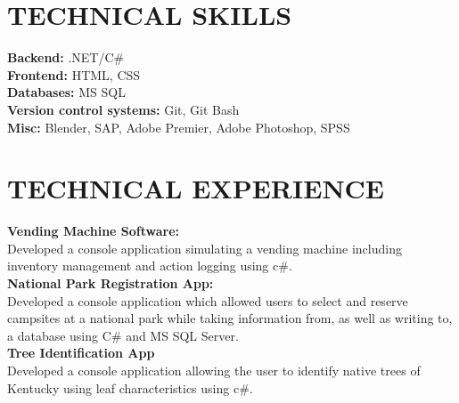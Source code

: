\documentclass[margin,line]{resume}
\begin{document}
\begin{resume}
    \vspace{-1mm}

\sectionline

    \section{\mysidestyle \textbf{\large{T}\small{ECHNICAL}  \large{S}\small{KILLS}}}

    \textbf{Backend:} .NET/C\#\vspace{1mm}\\
    \textbf{Frontend:} HTML, CSS\vspace{1mm}\\
    \textbf{Databases:} MS SQ\vspace{1mm}L\\
    \textbf{Version control systems:} Git, Git Bash\vspace{1mm}\\
    \textbf{Misc:} Blender, SAP, Adobe Premier, Adobe Photoshop, SPSS

\sectionline

    \section{\mysidestyle \textbf{\large{T}\small{ECHNICAL} \large{E}\small{XPERIENCE}}}
     \textbf{\listing Vending Machine Software:} \vspace{1mm}\\\vspace{0mm}%
Developed a console application simulating a vending machine including inventory management and action logging using c\#.\vspace{2mm}\\
\textbf{\listing National Park Registration App:} \vspace{1mm}\\\vspace{0mm}%
Developed a console application which allowed users to select and reserve campsites at a national park while taking information from, as well as writing to, a database using C\# and MS SQL Server.\vspace{2mm}\\
	\textbf{\listing Tree Identification App} \vspace{1mm}\\\vspace{0mm}%
Developed a console application allowing the user to identify native trees of Kentucky using leaf characteristics using c\#.


\end{resume}
\end{document}
